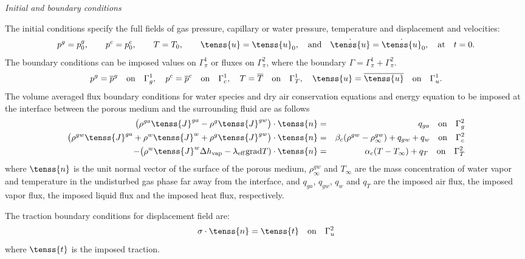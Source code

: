 { \it Initial and boundary conditions}

The initial conditions specify the full fields of gas pressure, capillary or water pressure, 
temperature and displacement and velocities:
\begin{equation}\label{init}
p^g = p^g_0, \qquad p^c = p^c_0, \qquad T = T_0, \qquad \tenss{u} = \tenss{u}_0, 
\quad {\rm and}  \quad \dot{\tenss{u}} = \dot{\tenss{u}}_0, \quad {\rm at}\quad t = 0. 
\end{equation}
The boundary conditions can be imposed values on $\Gamma^1_{\pi}$ or fluxes on $\Gamma^2_{\pi}$, where the boundary
$\Gamma = \Gamma^1_{\pi} + \Gamma^2_{\pi}$.
\begin{equation}\label{bound1}
p^g = \overline{p}^g \quad {\rm on} \quad \Gamma^1_{g}, \quad p^c = \overline{p}^c \quad {\rm on} \quad \Gamma^1_{c},
\quad T = \overline{T} \quad {\rm on} \quad \Gamma^1_{T}, \quad \tenss{u} = \overline{\tenss{u}}  \quad {\rm on} \quad \Gamma^1_{u}.
\end{equation}
The volume averaged flux boundary conditions for water species and dry air conservation equations 
and energy equation to be imposed at the interface between the porous medium and the surrounding fluid are as follows
\begin{eqnarray}\label{bound2}
\big(\rho^{ga}\tenss{J}^{ga} - \rho^{g}\tenss{J}^{gw}\big)\cdot\tenss{n} &=& q_{ga} \quad {\rm on} \quad \Gamma^2_{g}\nonumber\\
\big(\rho^{gw}\tenss{J}^{ga} + \rho^{w}\tenss{J}^{w} + \rho^{g}\tenss{J}^{gw}\big)\cdot\tenss{n} &=& 
\beta_c(\rho^{gw} -\rho^{gw}_{\infty}) + q_{gw} + q_{w}\quad {\rm on} \quad \Gamma^2_{c}\\
-\big(\rho^{w}\tenss{J}^{w}\Delta h_{\rm vap} - \lambda_{\rm eff}{\rm grad}T)\cdot\tenss{n} &=& 
\alpha_c(T - T_{\infty}) + q_{T}\quad {\rm on} \quad \Gamma^2_{T}\nonumber
\end{eqnarray}
where $\tenss{n}$ is the unit normal vector of the surface of the porous medium, $\rho^{gw}_{\infty}$ and $T_{\infty}$ 
are the mass concentration of water vapor and temperature in the undisturbed gas phase far away from the interface, 
and $q_{ga}$, $q_{gw}$, $q_w$ and $q_T$ are the imposed air flux, the imposed vapor flux, the imposed liquid flux and 
the imposed heat flux, respectively.

The traction boundary conditions for displacement field are:
\begin{equation}\label{bound3}
\sigma\cdot\tenss{n} = \tenss{t} \quad {\rm on} \quad \Gamma^2_{u}
\end{equation}
where $\tenss{t}$ is the imposed traction.

